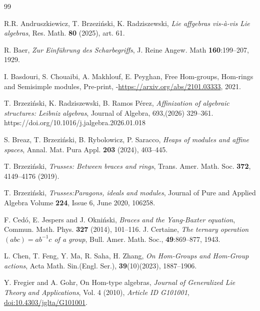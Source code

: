 \documentclass[14pt]{article}
\theoremstyle{Definition}
\theoremstyle{remark}
\begin{document}
\begin{thebibliography}{99}

R.R. Andruszkiewicz, T. Brzeziński, K. Radziszewski, \emph{Lie affgebras vis-à-vis Lie algebras}, Res. Math. \textbf{80} (2025), art. 61.

R. Baer, \emph{Zur Einf\"uhrung des Scharbegriffs}, J. Reine Angew. Math \textbf{160}:199–207, 1929.

I. Basdouri, S. Chouaibi, A. Makhlouf, E. Peyghan, Free Hom-groups, Hom-rings and Semisimple modules, Pre-print, -\url{https://arxiv.org/abs/2101.03333}, 2021.

T. Brzezi\'nski, K. Radziszewski, B. Ramos P\'erez, \emph{Affinization of algebraic structures: Leibniz algebras}, Journal of Algebra, 693,(2026) 329–361. https://doi.org/10.1016/j.jalgebra.2026.01.018 

S. Breaz, T. Brzezi\'nski, B. Rybolowicz, P. Saracco, \emph{Heaps of modules and affine spaces}, Annal. Mat. Pura Appl. \textbf{203} (2024), 403–445.

T. Brzezi\'nski, \emph{Trusses: Between braces and rings}, Trans. Amer. Math. Soc. \textbf{372}, 4149–4176 (2019).

T. Brzezi\'nski, \emph{Trusses:Paragons, ideals and modules}, Journal of Pure and Applied Algebra
Volume \textbf{224}, Issue 6, June 2020, 106258.

F. Ced\'o, E. Jespers and J. Okni\'nski, \emph{Braces and the Yang-Baxter equation}, Commun. Math. Phys. \textbf{327} (2014), 101–116.
 J. Certaine, \emph{The ternary operation $(abc) = ab^{-1}c$ of a group}, Bull. Amer. Math. Soc., \textbf{49}:869–877, 1943.
 
 L. Chen, T. Feng, Y. Ma, R. Saha, H. Zhang, \emph{On Hom-Groups and Hom-Group actions}, Acta Math. Sin.(Engl. Ser.), \textbf{39}(10)(2023), 1887–1906.
 
Y. Fregier and A. Gohr, On Hom-type algebras, \emph{Journal of Generalized Lie Theory and Applications}, Vol. 4 (2010), \emph{Article ID G101001},  \url{doi:10.4303/jglta/G101001}.


\end{thebibliography}
\end{document}
